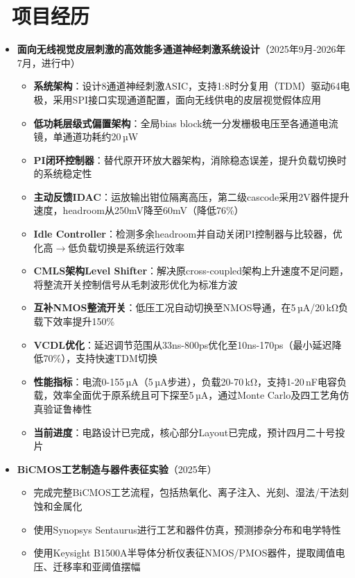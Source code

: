 \documentclass[11pt]{article}
\begin{document}
\section{\makebox[\widthof{\faGraduationCap}][c]{\color{CVBlue}\faUniversity}\ 项目经历}
\begin{itemize}
\item \textbf{面向无线视觉皮层刺激的高效能多通道神经刺激系统设计}（2025年9月-2026年7月，进行中）
    \begin{itemize}
    \item \textbf{系统架构}：设计8通道神经刺激ASIC，支持1:8时分复用（TDM）驱动64电极，采用SPI接口实现通道配置，面向无线供电的皮层视觉假体应用
    \item \textbf{低功耗层级式偏置架构}：全局bias block统一分发栅极电压至各通道电流镜，单通道功耗约20\,µW
    \item \textbf{PI闭环控制器}：替代原开环放大器架构，消除稳态误差，提升负载切换时的系统稳定性
    \item \textbf{主动反馈IDAC}：运放输出钳位隔离高压，第二级cascode采用2V器件提升速度，headroom从250mV降至60mV（降低76\%）
    \item \textbf{Idle Controller}：检测多余headroom并自动关闭PI控制器与比较器，优化高$\rightarrow$低负载切换是系统运行效率
    \item \textbf{CMLS架构Level Shifter}：解决原cross-coupled架构上升速度不足问题，将整流开关控制信号从毛刺波形优化为标准方波
    \item \textbf{互补NMOS整流开关}：低压工况自动切换至NMOS导通，在5\,µA/20\,kΩ负载下效率提升150\%
    \item \textbf{VCDL优化}：延迟调节范围从33ns-800ps优化至10ns-170ps（最小延迟降低70\%），支持快速TDM切换
    \item \textbf{性能指标}：电流0-155\,µA（5\,µA步进），负载20-70\,kΩ，支持1-20\,nF电容负载，效率全面优于原系统且可下探至5\,µA，通过Monte Carlo及四工艺角仿真验证鲁棒性
    \item \textbf{当前进度}：电路设计已完成，核心部分Layout已完成，预计四月二十号投片
    \end{itemize}
    \item \textbf{BiCMOS工艺制造与器件表征实验}（2025年）
    \begin{itemize}
        \item 完成完整BiCMOS工艺流程，包括热氧化、离子注入、光刻、湿法/干法刻蚀和金属化
        \item 使用Synopsys Sentaurus进行工艺和器件仿真，预测掺杂分布和电学特性
        \item 使用Keysight B1500A半导体分析仪表征NMOS/PMOS器件，提取阈值电压、迁移率和亚阈值摆幅

\end{itemize}
\end{itemize}
\end{document}
